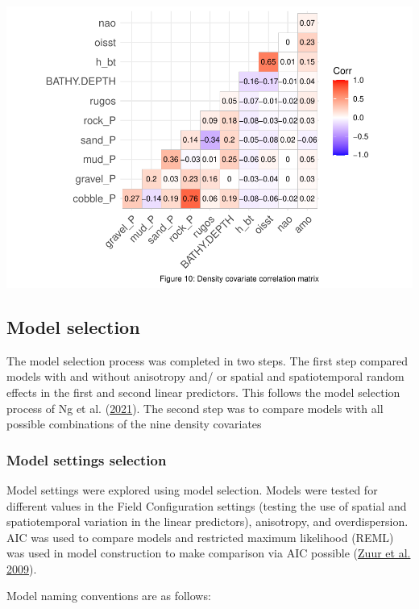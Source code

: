 \documentclass[
]{article}
\begin{document}
\includegraphics{ToR1_TechPaper_files/figure-latex/collinearity-1.pdf}

\hypertarget{model-selection}{%
\subsection{Model selection}\label{model-selection}}

The model selection process was completed in two steps. The first step compared models with and without anisotropy and/ or spatial and spatiotemporal random effects in the first and second linear predictors. This follows the model selection process of Ng et al. (\protect\hyperlink{ref-ng_2021}{2021}). The second step was to compare models with all possible combinations of the nine density covariates

\hypertarget{model-settings-selection}{%
\subsubsection{Model settings selection}\label{model-settings-selection}}

Model settings were explored using model selection. Models were tested for different values in the Field Configuration settings (testing the use of spatial and spatiotemporal variation in the linear predictors), anisotropy, and overdispersion. AIC was used to compare models and restricted maximum likelihood (REML) was used in model construction to make comparison via AIC possible (\protect\hyperlink{ref-zuur_2009}{Zuur et al. 2009}).

Model naming conventions are as follows:
\end{document}
